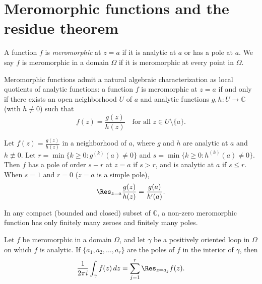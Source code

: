 \section*{Meromorphic functions and the residue theorem}

\begin{definition}
    A function \(f\) is \emph{meromorphic} at \(z = a\) if it is analytic at \(a\) or has a pole at \(a\).
    We say \(f\) is meromorphic in a domain \(\Omega\) if it is meromorphic at every point in \(\Omega\).
\end{definition}

Meromorphic functions admit a natural algebraic characterization as local quotients of analytic functions:
a function \(f\) is meromorphic at \(z = a\) if and only if there exists an open neighborhood \(U\) of \(a\) and analytic functions \(g, h \colon U \to \mathbb{C}\) (with \(h \not\equiv 0\)) such that
\[
    f(z) = \frac{g(z)}{h(z)} \quad \text{for all } z \in U \setminus \{a\}.
\]

\begin{lemma}
    \label{lem:quotient-poles}
    Let \(f(z) = \frac{g(z)}{h(z)}\) in a neighborhood of \(a\), where \(g\) and \(h\) are analytic at \(a\) and \(h \not\equiv 0\).
    Let \(r = \min \{ k \ge 0 : g^{(k)}(a) \neq 0 \}\) and \(s = \min \{ k \ge 0 : h^{(k)}(a) \neq 0 \}\).
    Then \(f\) has a pole of order \(s - r\) at \(z = a\) if \(s > r\), and is analytic at \(a\) if \(s \le r\).
    When \(s = 1\) and \(r = 0\) (\(z = a\) is a simple pole),
    \[
        \Res_{z=a} \frac{g(z)}{h(z)} = \frac{g(a)}{h'(a)}.
    \]
\end{lemma}

\begin{proposition}
    In any compact (bounded and closed) subset of \(\mathbb{C}\), a non-zero meromorphic function has only finitely many zeroes and finitely many poles.
\end{proposition}

\begin{theorem}
    \label{thm:cauchy-residue}
    Let \(f\) be meromorphic in a domain \(\Omega\), and let \(\gamma\) be a positively oriented loop in \(\Omega\) on which \(f\) is analytic.
    If \(\{a_1, a_2, \dots, a_r\}\) are the poles of \(f\) in the interior of \(\gamma\), then
    \[
        \frac{1}{2\pi i} \int_\gamma f(z) \, dz = \sum_{j=1}^r \Res_{z = a_j} f(z).
    \]
\end{theorem}



